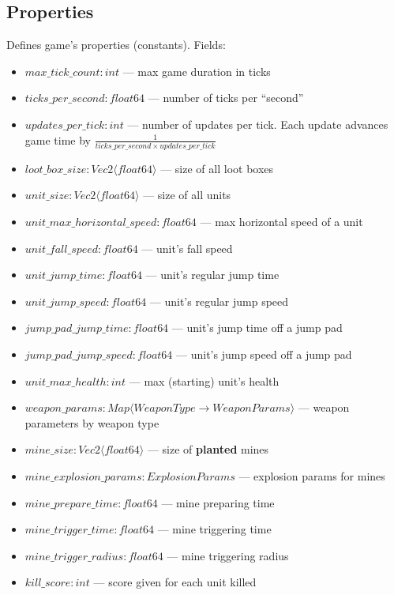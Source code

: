 \subsection{Properties}
Defines game's properties (constants). Fields:
\begin{itemize}
    \item $max\_tick\_count : int$ --- max game duration in ticks
    \item $ticks\_per\_second : float64$ --- number of ticks per ``second''
    \item $updates\_per\_tick : int$ --- number of updates per tick.
        Each update advances game time by $\frac{1}{ticks\_per\_second \times updates\_per\_tick}$
    \item $loot\_box\_size : Vec2 \langle float64 \rangle$ --- size of all loot boxes
    \item $unit\_size : Vec2 \langle float64 \rangle$ --- size of all units
    \item $unit\_max\_horizontal\_speed : float64$ --- max horizontal speed of a unit
    \item $unit\_fall\_speed : float64$ --- unit's fall speed
    \item $unit\_jump\_time : float64$ --- unit's regular jump time
    \item $unit\_jump\_speed : float64$ --- unit's regular jump speed
    \item $jump\_pad\_jump\_time : float64$ --- unit's jump time off a jump pad
    \item $jump\_pad\_jump\_speed : float64$ --- unit's jump speed off a jump pad
    \item $unit\_max\_health : int$ --- max (starting) unit's health
    \item $weapon\_params : Map \langle WeaponType \rightarrow WeaponParams \rangle$ --- weapon parameters by weapon type
    \item $mine\_size : Vec2 \langle float64 \rangle$ --- size of \textbf{planted} mines
    \item $mine\_explosion\_params : ExplosionParams$ --- explosion params for mines
    \item $mine\_prepare\_time : float64$ --- mine preparing time
    \item $mine\_trigger\_time : float64$ --- mine triggering time
    \item $mine\_trigger\_radius : float64$ --- mine triggering radius
    \item $kill\_score : int$ --- score given for each unit killed
\end{itemize}

